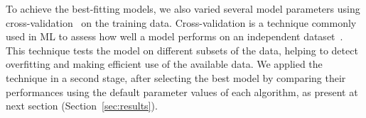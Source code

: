 
To achieve the best-fitting models, we also varied several model parameters using cross-validation~\cite{DBLP:phd/us/Stephenson22} on the training data.
Cross-validation is a technique commonly used in ML to assess how well a model performs on an independent dataset~\cite{DBLP:journals/jsan/AwadF23}.
This technique tests the model on different subsets of the data, helping to detect overfitting and making efficient use of the available data. We applied the technique in a second stage, after selecting the best model by comparing their performances using the default parameter values of each algorithm, as present at next section (Section~\ref{sec:results}).












